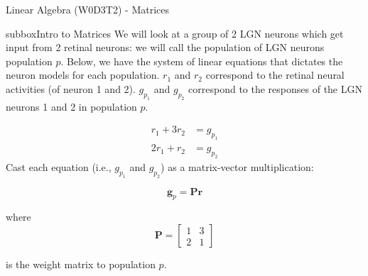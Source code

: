 \begin{textbox}{Linear Algebra (W0D3T2) - Matrices}
\begin{subbox}{subbox}{Intro to Matrices}
\scriptsize
We will look at a group of 2 LGN neurons which get input from 2 retinal neurons: we will call the population of LGN neurons population $p$. Below, we have the system of linear equations that dictates the neuron models for each population. $r_1$ and $r_2$ correspond to the retinal neural activities (of neuron 1 and 2). $g_{p_1}$ and  $g_{p_2}$ correspond to the responses of the LGN neurons 1 and 2 in population $p$. 

\begin{align}
r_1 + 3r_2 &= g_{p_1} \\
2r_1 + r_2 &= g_{p_2} 
\end{align}
Cast each equation (i.e., $g_{p_1}$ and $g_{p_2}$) as a matrix-vector multiplication: 

\begin{equation}
\mathbf{g}_p = \mathbf{P}\mathbf{r}
\end{equation}

where \begin{equation}\mathbf{P}=
\begin{bmatrix}
1 & 3 \\
2 & 1
\end{bmatrix}
\end{equation}

is the weight matrix to population $p$. 
\end{subbox}
\end{textbox}

